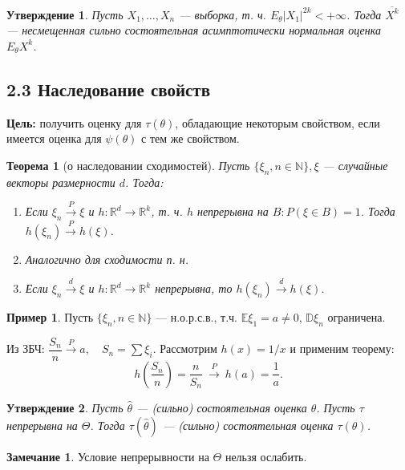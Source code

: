 \documentclass[12pt]{report}
\newtheorem{theorem}{Теорема}
\newtheorem{proposition}{Утверждение}
\theoremstyle{definition}
\newtheorem{example}{Пример}
\newtheorem{remark}{Замечание}
\begin{document}
\begin{proposition}
	Пусть $X_1, \dots, X_n$ — выборка, т. ч. $E_\theta |X_1|^{2k} < + \infty$. Тогда $\overline{X^k}$ — несмещенная сильно состоятельная асимптотически нормальная оценка $E_\theta X^{k}$.
\end{proposition}

\subsection{2.3 Наследование свойств}
\textbf{Цель:} получить оценку для $\tau(\theta)$, обладающие некоторым свойством, если имеется оценка для $\psi(\theta)$ с тем же свойством. 

\begin{theorem}[о наследовании сходимостей]
	Пусть $\{\xi_n, n \in \mathbb{N} \}, \xi$ — случайные векторы размерности $d$. Тогда:
	\begin{enumerate}
		\item Если $\xi_n \xrightarrow{P} \xi$ и $h: \mathbb{R}^d \rightarrow \mathbb{R}^k$, т. ч. $h$ непрерывна на $B : P(\xi \in B) = 1$. Тогда $h(\xi_n) \xrightarrow{P} h(\xi)$.
		\item Аналогично для сходимости п. н.
		\item Если $\xi_n \xrightarrow{d} \xi$ и $h: \mathbb{R}^d \rightarrow \mathbb{R}^k$ непрерывна, то $h(\xi_n) \xrightarrow{d} h(\xi)$.
	\end{enumerate}
\end{theorem}

\begin{example}
	Пусть $\{\xi_n, n \in \mathbb{N} \}$ — н.о.р.с.в., т.ч. $\mathbb{E}\xi_1 = a \neq 0$, $\mathbb{D}\xi_n$ ограничена.

	Из ЗБЧ: $\dfrac{S_n}{n} \xrightarrow{P} a, \quad S_n = \sum \xi_i$. Рассмотрим $h(x) = 1/x$ и применим теорему:
$$ h\left(\frac{S_n}{n}\right) = \frac{n}{S_n} \ \xrightarrow{P} \ h(a) = \frac{1}{a}. $$
\end{example}

\begin{proposition}
	Пусть $\hat{\theta}$ —  (сильно) состоятельная оценка $\theta$. Пусть $\tau$ непрерывна на $\Theta$. Тогда $\tau(\hat{\theta})$ — (сильно) состоятельная оценка $\tau(\theta)$.
\end{proposition}

\begin{remark}
	Условие непрерывности на $\Theta$ нельзя ослабить.
\end{remark}
\end{document}
